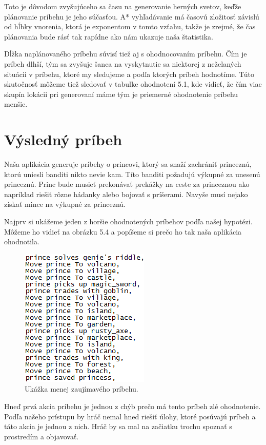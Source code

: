 Toto je dôvodom zvyšujúceho sa času na generovanie herných svetov, keďže plánovanie príbehu je jeho súčasťou. A* vyhľadávanie má časovú zložitosť závislú od hĺbky vnorenia, ktorá je exponentom v tomto vzťahu, takže je zrejmé, že čas plánovania bude rásť tak rapídne ako nám ukazuje naša štatistika.\par
Dĺžka naplánovaného príbehu súvisí tiež aj s ohodnocovaním príbehu. Čím je príbeh dlhší, tým sa zvyšuje šanca na vyskytnutie sa niektorej z neželaných situácii v príbehu, ktoré my sledujeme a podľa ktorých príbeh hodnotíme. Túto skutočnosť môžeme tiež sledovať v tabuľke ohodnotení 5.1, kde vidieť, že čím viac skupín lokácii pri generovaní máme tým je priemerné ohodnotenie príbehu menšie.
\section{Výsledný príbeh}
Naša aplikácia generuje príbehy o princovi, ktorý sa snaží zachrániť princeznú, ktorú uniesli banditi nikto nevie kam. Títo banditi požadujú výkupné za unesenú princeznú. Princ bude musieť prekonávať prekážky na ceste za princeznou ako napríklad riešiť rôzne hádanky alebo bojovať s príšerami. Navyše musí nejako získať mince na výkupné za princeznú.\par
Najprv si ukážeme jeden z horšie ohodnotených príbehov podľa našej hypotézi. Môžeme ho vidieť na obrázku 5.4 a popíšeme si prečo ho tak naša aplikácia ohodnotila.
\begin{figure}[H] 
\begin{center}
\includegraphics[scale=1.0]{img/zly_pribeh.png}
\caption{Ukážka menej zaujímavého príbehu.}
\label{fig:ch54}
\end{center}
\end{figure}
Hneď prvá akcia príbehu je jednou z chýb prečo má tento príbeh zlé ohodnotenie. Podľa našeho prístupu by hráč nemal hned riešiť úlohy, ktoré posúvajú príbeh a táto akcia je jednou z nich. Hráč by sa mal na začiatku trochu spoznať s prostredím a objavovať.\par
